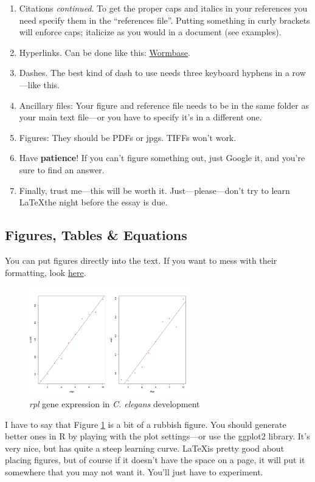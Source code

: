 \documentclass[onecolumn]{article}
\begin{document}
\begin{enumerate}
\item Citations \emph{continued}. To get the proper caps and italics in your references you need specify them in the ``references file''. Putting something in curly brackets will enforce caps; italicize as you would in a document (see examples). 
\item Hyperlinks. Can be done like this: \href{http://www.wormbase.org/}{Wormbase}.
\item Dashes. The best kind of dash to use needs three keyboard hyphens in a row---like this.
\item Ancillary files: Your figure and reference file needs to be in the same folder as your main text file---or you have to specify it's in a different one.
\item Figures: They should be PDFs or jpgs. TIFFs won't work.
\item Have \textbf{patience}! If you can't figure something out, just Google it, and you're sure to find an answer.
\item Finally, trust me---this will be worth it. Just---please---don't try to learn \LaTeX  the night before the essay is due.
\end{enumerate}

\subsection{Figures, Tables \& Equations}

You can put figures directly into the text. If you want to mess with their formatting, look \href{http://en.wikibooks.org/wiki/LaTeX/Floats,_Figures_and_Captions}{here}.

\begin{figure}[h]
\centering
\includegraphics[width=7cm]{rpl}
\caption{\emph{rpl} gene expression in \emph{C. elegans} development}
\label{fig:rpl}
\end{figure}

I have to say that Figure \ref{fig:rpl} is a bit of a rubbish figure. You should generate better ones in R by playing with the plot settings---or use the ggplot2 library. It's very nice, but has quite a steep learning curve. \LaTeX is pretty good about placing figures, but of course if it doesn't have the space on a page, it will put it somewhere that you may not want it. You'll just have to experiment. 
\end{document}
